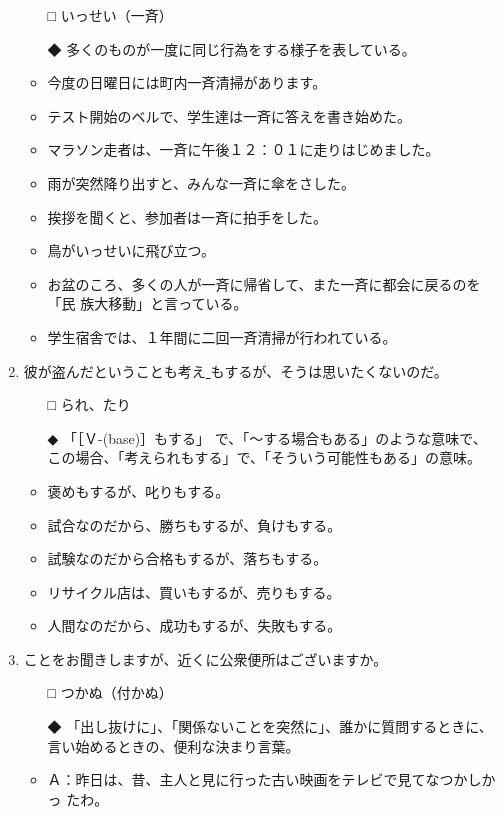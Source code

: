 \documentclass[
uplatex,
b5paper,
10pt,
dvipdfmx
]{jsbook}
\begin{document}
\begin{enumerate}
\begin{itemize}
\item[□] いっせい（一斉）
\item[◆] 多くのものが一度に同じ行為をする様子を表している。
\end{itemize}
\begin{itemize}
\item 今度の日曜日には町内一斉清掃があります。
\item テスト開始のベルで、学生達は一斉に答えを書き始めた。
\item マラソン走者は、一斉に午後１２：０１に走りはじめました。
\item 雨が突然降り出すと、みんな一斉に傘をさした。
\item 挨拶を聞くと、参加者は一斉に拍手をした。
\item 鳥がいっせいに飛び立つ。
\item お盆のころ、多くの人が一斉に帰省して、また一斉に都会に戻るのを「民
      族大移動」と言っている。
\item 学生宿舎では、１年間に二回一斉清掃が行われている。
\end{itemize}


\item 彼が盗んだということも考え\underline{  }もするが、そうは思いたくないのだ。
\begin{itemize}
\item[□] られ、たり
\item[◆] 「［Ｖ-(base)］もする」 で、「〜する場合もある」のような意味で、
	  この場合、「考えられもする」で、「そういう可能性もある」の意味。
\end{itemize}
\begin{itemize}
\item 褒めもするが、叱りもする。
\item 試合なのだから、勝ちもするが、負けもする。
\item 試験なのだから合格もするが、落ちもする。
\item リサイクル店は、買いもするが、売りもする。
\item 人間なのだから、成功もするが、失敗もする。
\end{itemize}

\item \underline{    }ことをお聞きしますが、近くに公衆便所はございますか。
\begin{itemize}
\item[□] つかぬ（付かぬ）
\item[◆] 「出し抜けに」、「関係ないことを突然に」、誰かに質問するときに、
	  言い始めるときの、便利な決まり言葉。
\end{itemize}
\begin{itemize}
\item Ａ：昨日は、昔、主人と見に行った古い映画をテレビで見てなつかしかっ
      たわ。


\end{itemize}
\end{enumerate}
\end{document}
